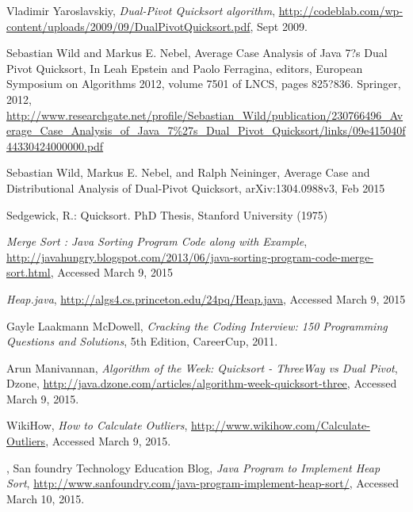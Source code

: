 \documentclass{article}
\begin{document}
\begin{thebibliography}{9}

  Vladimir Yaroslavskiy,
  \emph{Dual-Pivot Quicksort algorithm},
  \url{http://codeblab.com/wp-content/uploads/2009/09/DualPivotQuicksort.pdf},
  Sept 2009.
  
Sebastian Wild and Markus E. Nebel,
Average Case Analysis of Java 7?s Dual Pivot Quicksort,
In Leah Epstein and Paolo Ferragina, editors, 
European Symposium on Algorithms 2012, 
volume 7501 of LNCS, pages 825?836. Springer, 2012,
\url{http://www.researchgate.net/profile/Sebastian_Wild/publication/230766496_Average_Case_Analysis_of_Java_7%27s_Dual_Pivot_Quicksort/links/09e415040f44330424000000.pdf}

Sebastian Wild, Markus E. Nebel, and Ralph Neininger,
Average Case and Distributional Analysis of Dual-Pivot Quicksort,
arXiv:1304.0988v3, Feb 2015

Sedgewick, R.: Quicksort. PhD Thesis, Stanford University (1975)

\emph{Merge Sort : Java Sorting Program Code along with Example},
\url{http://javahungry.blogspot.com/2013/06/java-sorting-program-code-merge-sort.html},
Accessed March 9, 2015

\emph{Heap.java},
\url{http://algs4.cs.princeton.edu/24pq/Heap.java},
Accessed March 9, 2015

Gayle Laakmann McDowell, 
\emph{Cracking the Coding Interview: 150 Programming Questions and Solutions},
5th Edition,
CareerCup, 2011.

Arun Manivannan,
\emph{Algorithm of the Week: Quicksort - ThreeWay vs Dual Pivot},
Dzone,
\url{http://java.dzone.com/articles/algorithm-week-quicksort-three},
Accessed March 9, 2015.

WikiHow,
\emph{How to Calculate Outliers},
\url{http://www.wikihow.com/Calculate-Outliers},
Accessed March 9, 2015.

,
San foundry Technology Education Blog,
\emph{Java Program to Implement Heap Sort},
\url{http://www.sanfoundry.com/java-program-implement-heap-sort/},
Accessed March 10, 2015.
\end{thebibliography}
\end{document}
